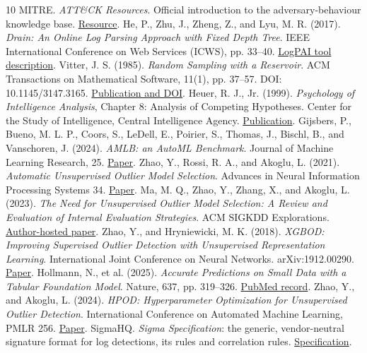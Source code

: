 \documentclass[11pt,a4paper]{article}
\begin{document}
\begin{thebibliography}{10}
 MITRE. \emph{ATT\&CK Resources}. Official introduction to the adversary-behaviour knowledge base. \href{\detokenize{https://attack.mitre.org/resources/}}{Resource}.
 He, P., Zhu, J., Zheng, Z., and Lyu, M. R. (2017). \emph{Drain: An Online Log Parsing Approach with Fixed Depth Tree}. IEEE International Conference on Web Services (ICWS), pp. 33--40. \href{\detokenize{https://logparser.readthedocs.io/en/latest/tools/Drain.html}}{LogPAI tool description}.
 Vitter, J. S. (1985). \emph{Random Sampling with a Reservoir}. ACM Transactions on Mathematical Software, 11(1), pp. 37--57. DOI: 10.1145/3147.3165. \href{\detokenize{https://doi.org/10.1145/3147.3165}}{Publication and DOI}.
 Heuer, R. J., Jr. (1999). \emph{Psychology of Intelligence Analysis}, Chapter 8: Analysis of Competing Hypotheses. Center for the Study of Intelligence, Central Intelligence Agency. \href{\detokenize{https://www.cia.gov/resources/csi/static/Pyschology-of-Intelligence-Analysis.pdf}}{Publication}.
 Gijsbers, P., Bueno, M. L. P., Coors, S., LeDell, E., Poirier, S., Thomas, J., Bischl, B., and Vanschoren, J. (2024). \emph{AMLB: an AutoML Benchmark}. Journal of Machine Learning Research, 25. \href{\detokenize{https://jmlr.org/papers/v25/22-0493.html}}{Paper}.
 Zhao, Y., Rossi, R. A., and Akoglu, L. (2021). \emph{Automatic Unsupervised Outlier Model Selection}. Advances in Neural Information Processing Systems 34. \href{\detokenize{https://proceedings.neurips.cc/paper/2021/file/23c894276a2c5a16470e6a31f4618d73-Paper.pdf}}{Paper}.
 Ma, M. Q., Zhao, Y., Zhang, X., and Akoglu, L. (2023). \emph{The Need for Unsupervised Outlier Model Selection: A Review and Evaluation of Internal Evaluation Strategies}. ACM SIGKDD Explorations. \href{\detokenize{https://www.andrew.cmu.edu/user/lakoglu/pubs/23-SigKDDExplor-UnsupervisedModelSelection-WhitePaperSurvey.pdf}}{Author-hosted paper}.
 Zhao, Y., and Hryniewicki, M. K. (2018). \emph{XGBOD: Improving Supervised Outlier Detection with Unsupervised Representation Learning}. International Joint Conference on Neural Networks. arXiv:1912.00290. \href{\detokenize{https://arxiv.org/abs/1912.00290}}{Paper}.
 Hollmann, N., et al. (2025). \emph{Accurate Predictions on Small Data with a Tabular Foundation Model}. Nature, 637, pp. 319--326. \href{\detokenize{https://pubmed.ncbi.nlm.nih.gov/39780007/}}{PubMed record}.
 Zhao, Y., and Akoglu, L. (2024). \emph{HPOD: Hyperparameter Optimization for Unsupervised Outlier Detection}. International Conference on Automated Machine Learning, PMLR 256. \href{\detokenize{https://proceedings.mlr.press/v256/zhao24a.html}}{Paper}.
 SigmaHQ. \emph{Sigma Specification}: the generic, vendor-neutral signature format for log detections, its rules and correlation rules. \href{\detokenize{https://github.com/SigmaHQ/sigma-specification}}{Specification}.
\end{thebibliography}
\endgroup
\end{document}
